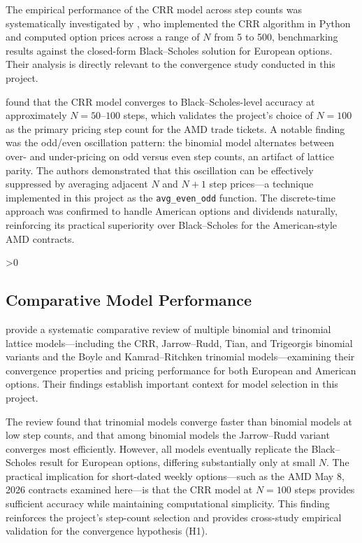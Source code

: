 \documentclass[12pt, letterpaper]{article}
\let\oldsubsection\subsection
\renewcommand{\subsection}{%
  \ifnum\value{subsection}>0 \clearpage\fi
  \oldsubsection
}
\begin{document}
The empirical performance of the CRR model across step counts was
systematically investigated by \citet{Nwobi2023}, who implemented the
CRR algorithm in Python and computed option prices across a range of
$N$ from 5 to 500, benchmarking results against the closed-form
Black--Scholes solution for European options. Their analysis is
directly relevant to the convergence study conducted in this project.

\citet{Nwobi2023} found that the CRR model converges to
Black--Scholes-level accuracy at approximately $N = 50$--$100$ steps,
which validates the project's choice of $N = 100$ as the primary
pricing step count for the AMD trade tickets. A notable finding was
the odd/even oscillation pattern: the binomial model alternates
between over- and under-pricing on odd versus even step counts, an
artifact of lattice parity. The authors demonstrated that this
oscillation can be effectively suppressed by averaging adjacent $N$
and $N+1$ step prices---a technique implemented in this project as the
\texttt{avg\_even\_odd} function. The discrete-time approach was
confirmed to handle American options and dividends naturally,
reinforcing its practical superiority over Black--Scholes for the
American-style AMD contracts.

\subsection{Comparative Model Performance}

\citet{Josheski2020} provide a systematic comparative review of
multiple binomial and trinomial lattice models---including the CRR,
Jarrow--Rudd, Tian, and Trigeorgis binomial variants and the Boyle and
Kamrad--Ritchken trinomial models---examining their convergence
properties and pricing performance for both European and American
options. Their findings establish important context for model selection
in this project.

The review found that trinomial models converge faster than binomial
models at low step counts, and that among binomial models the
Jarrow--Rudd variant converges most efficiently. However, all models
eventually replicate the Black--Scholes result for European options,
differing substantially only at small $N$. The practical implication
for short-dated weekly options---such as the AMD May 8, 2026 contracts
examined here---is that the CRR model at $N = 100$ steps provides
sufficient accuracy while maintaining computational simplicity. This
finding reinforces the project's step-count selection and provides
cross-study empirical validation for the convergence hypothesis (H1).
\end{document}
